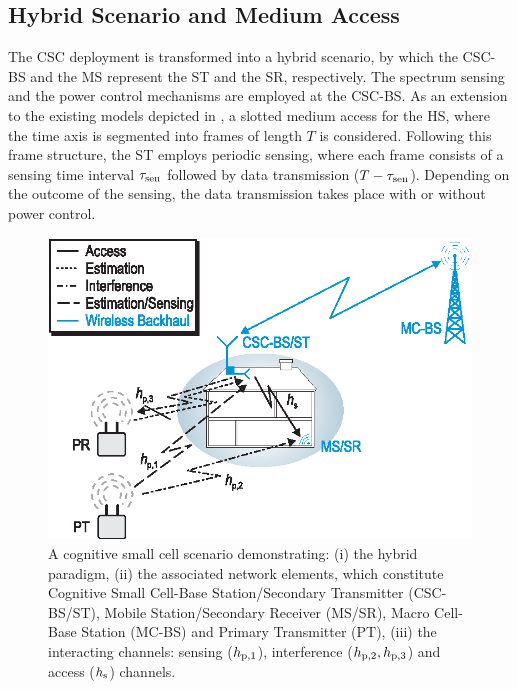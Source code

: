 \subsection{Hybrid Scenario and Medium Access}
The CSC deployment is transformed into a hybrid scenario, by which the CSC-BS and the MS represent the ST and the SR, respectively. The spectrum sensing and the power control mechanisms are employed at the CSC-BS. As an extension to the existing models depicted in \cite{Kang09, Sharma14}, a slotted medium access for the HS, where the time axis is segmented into frames of length $T$ is considered. Following this frame structure, the ST employs periodic sensing, where each frame consists of a sensing time interval $\tau_{\text{sen}}$ followed by data transmission ($T - \tau_{\text{sen}}$). Depending on the outcome of the sensing, the data transmission takes place with or without power control. 
\begin{figure}[!t]
\centering
\includegraphics[width = \figscalet]{figures/CR_Scenario_Hybrid}
\caption{A cognitive small cell scenario demonstrating: (i) the hybrid paradigm, (ii) the associated network elements, which constitute Cognitive Small Cell-Base Station/Secondary Transmitter (CSC-BS/ST), Mobile Station/Secondary Receiver (MS/SR), Macro Cell-Base Station (MC-BS) and Primary Transmitter (PT), (iii) the interacting channels: sensing ($h_{\text{p,1}}$), interference ($h_{\text{p,2}}, h_{\text{p,3}}$) and access ($h_{\text{s}}$) channels.}
\label{fig_HS:scenario}
\end{figure}

